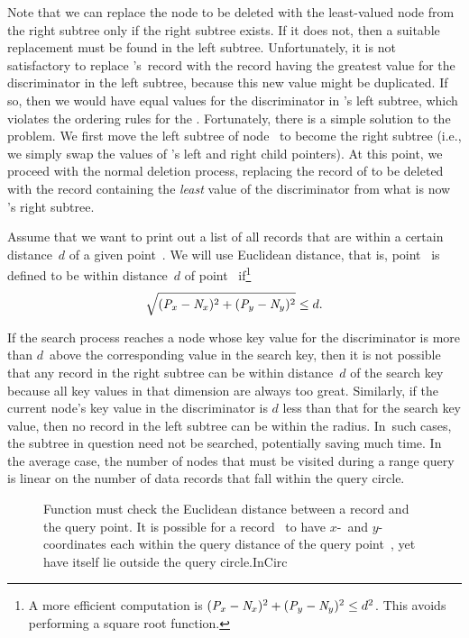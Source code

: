Note that we can replace the node to be deleted with the least-valued
node from the right subtree only if the right subtree exists.
If it does not, then a suitable replacement must be found in the left
subtree.
Unfortunately, it is not satisfactory to replace 's~record
with the record having the greatest value for the discriminator in the
left subtree, because this new value might be duplicated.
If so, then we would have equal values for the discriminator in
's left subtree, which violates the ordering rules for the
\KDtree.
Fortunately, there is a simple solution to the problem.
We first move the left subtree of node~ to become the
right subtree (i.e., we simply swap the values of 's left and
right child pointers).
At this point, we proceed with the normal deletion process, replacing
the record of  to be deleted with the record containing
the \emph{least} value of the discriminator from what is now
's right subtree.

Assume that we want to print out a list of all records that are within
a certain distance~$d$ of a given point~.
We will use Euclidean distance, that is, point~ is defined to
be within distance~$d$ of point~ if\footnote{A more efficient
computation is \(({\textit{P}}_x - {\textit{N}}_x)^2 +
({\textit{P}}_y - {\textit{N}}_y)^2 \leq d^2\).
This avoids performing a square root function.}
\[\sqrt{({\textit{P}}_x - {\textit{N}}_x)^2 + ({\textit{P}}_y - {\textit{N}}_y)^2}
\leq d.\]

If the search process reaches a node whose key value for the
discriminator is more than $d$~above the corresponding value in the
search key, then it is not possible that any record in the right
subtree can be within distance~$d$ of the search key because all key
values in that dimension are always too great.
Similarly, if the current node's key value in the discriminator
is $d$ less than that for the search key value, then no record in the
left subtree can be within the radius.
In~such cases, the subtree in question need not be searched,
potentially saving much time.
In the average case, the number of nodes that must be visited during a
range query is linear on the number of data records that fall within
the query circle.

\begin{figure}
\vspace{-\medskipamount}

{Function  must check the Euclidean distance between a
record and the query point.
It is possible for a record~ to have $x$-~and $y$-coordinates
each within the query distance of the query point~, yet have
 itself lie outside the query circle.}{InCirc}
\bigskip
\end{figure}

